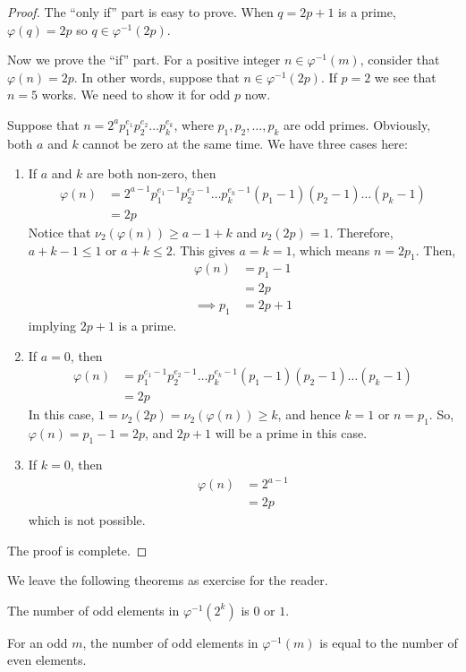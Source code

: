 \documentclass[main.tex]{subfile}
\begin{document}
		\begin{proof}
			The ``only if'' part is easy to prove. When $q=2p+1$ is a prime, $\varphi(q)=2p$ so $q\in\varphi^{-1}(2p)$.

			Now we prove the ``if'' part. For a positive integer $n\in\varphi^{-1}(m)$, consider that $\varphi(n)=2p$. In other words, suppose that $n \in\varphi^{-1}(2p)$.  If $p=2$ we see that $n=5$ works. We need to show it for odd $p$ now.

			Suppose that $n= 2^a p_1^{e_1}p_2^{e_2}\dots p_k^{e_k}$, where $p_1, p_2, \dots, p_k$ are odd primes. Obviously, both $a$ and $k$ cannot be zero at the same time. We have three cases here:

				\begin{enumerate}
					\item If $a$ and $k$ are both non-zero, then
						\begin{align*}
							\varphi(n) &= 2^{a-1} p_1^{e_1-1}p_2^{e_2-1}\dots p_k^{e_k-1} (p_1-1)(p_2-1)\dots (p_k-1)\\
									   &= 2p
						\end{align*}
					Notice that $\nu_2(\varphi(n)) \geq a-1+k$ and $\nu_2(2p)=1$. Therefore, $a+k-1 \leq 1$ or $a+k \leq 2$. This gives $a=k=1$, which means $n=2p_1$. Then,
						\begin{align*}
							\varphi(n)   &= p_1-1\\
									     &= 2p\\
							\implies p_1 &= 2p+1
						\end{align*}
					implying $2p+1$ is a prime.

					\item If $a=0$, then
						\begin{align*}
							\varphi(n) &= p_1^{e_1-1}p_2^{e_2-1}\dots p_k^{e_k-1} (p_1-1)(p_2-1)\dots (p_k-1)\\
									   &= 2p
						\end{align*}
					In this case, $1 = \nu_2(2p) = \nu_2(\varphi(n)) \geq k$, and hence $k=1$ or $n=p_1$. So, $\varphi(n)=p_1-1=2p$, and $2p+1$ will be a prime in this case.

					\item If $k=0$, then
						\begin{align*}
							\varphi(n) &= 2^{a-1}\\
									   &= 2p
						\end{align*}
					which is not possible.
				\end{enumerate}
			The proof is complete.
		\end{proof}

	We leave the following theorems as exercise for the reader.
		\begin{theorem}
			The number of odd elements in $\varphi^{-1}(2^k)$ is $0$ or $1$.
		\end{theorem}

		\begin{theorem}
			For an odd $m$, the number of odd elements in $\varphi^{-1}(m)$ is equal to the number of even elements.
		\end{theorem}
\end{document}
